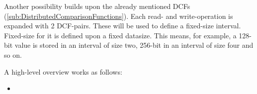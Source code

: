 \label{sub:DCFIntervals}
Another possibility builds upon the already mentioned DCFs (\ref{sub:DistributedComparisonFunctions}).
Each read- and write-operation is expanded with 2 DCF-pairs.
These will be used to define a fixed-size interval.
Fixed-size for it is defined upon a fixed datasize.
This means, for example, a 128-bit value is stored in an interval of size two, 256-bit in an interval of size four and so on.

A high-level overview works as follows:
\begin{itemize}
    \item 
\end{itemize}